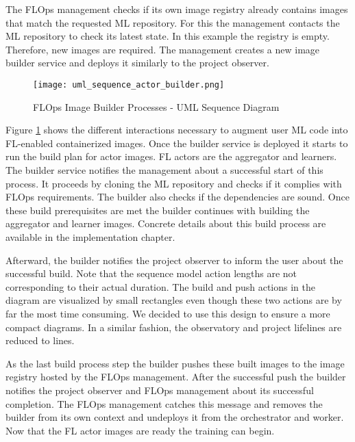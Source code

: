 The FLOps management checks if its own image registry already contains images that match the requested ML repository.
For this the management contacts the ML repository to check its latest state.
In this example the registry is empty.
Therefore, new images are required.
The management creates a new image builder service and deploys it similarly to the project observer.

\begin{figure}[h]
    \begin{adjustwidth}{-0.2\paperwidth}{-0.2\paperwidth}
        \centering
        \texttt{[image: uml\_sequence\_actor\_builder.png]}
        \caption{FLOps Image Builder Processes - UML Sequence Diagram}
        \label{fig:uml_sequence_builder}
    \end{adjustwidth}
\end{figure}

Figure \ref{fig:uml_sequence_builder} shows the different interactions necessary to augment user ML code into FL-enabled containerized images.
Once the builder service is deployed it starts to run the build plan for actor images.
FL actors are the aggregator and learners.
The builder service notifies the management about a successful start of this process.
It proceeds by cloning the ML repository and checks if it complies with FLOps requirements.
The builder also checks if the dependencies are sound.
Once these build prerequisites are met the builder continues with building the aggregator and learner images.
Concrete details about this build process are available in the implementation chapter.

Afterward, the builder notifies the project observer to inform the user about the successful build.
Note that the sequence model action lengths are not corresponding to their actual duration.
The build and push actions in the diagram are visualized by small rectangles even though these two actions are by far the most time consuming.
We decided to use this design to ensure a more compact diagrams.
In a similar fashion, the observatory and project lifelines are reduced to lines.

As the last build process step the builder pushes these built images to the image registry hosted by the FLOps management.
After the successful push the builder notifies the project observer and FLOps management about its successful completion.
The FLOps management catches this message and removes the builder from its own context and undeploys it from the orchestrator and worker.
Now that the FL actor images are ready the training can begin.

